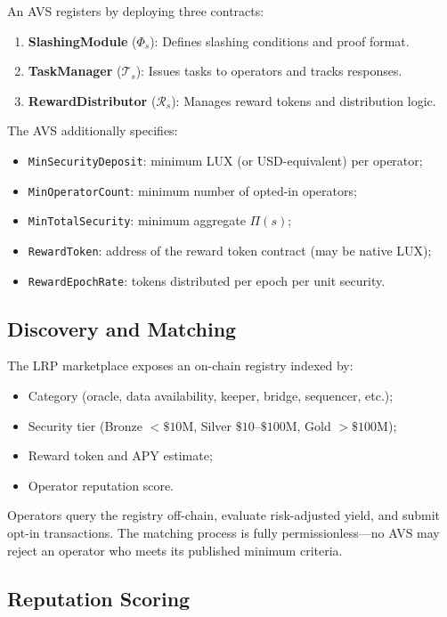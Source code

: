 \documentclass[11pt]{article}
\begin{document}
An AVS registers by deploying three contracts:

\begin{enumerate}[leftmargin=1.5em]
  \item \textbf{SlashingModule} ($\Phi_s$): Defines slashing conditions and proof format.
  \item \textbf{TaskManager} ($\mathcal{T}_s$): Issues tasks to operators and tracks responses.
  \item \textbf{RewardDistributor} ($\mathcal{R}_s$): Manages reward tokens and distribution logic.
\end{enumerate}

The AVS additionally specifies:
\begin{itemize}[leftmargin=1.5em]
  \item \texttt{MinSecurityDeposit}: minimum LUX (or USD-equivalent) per operator;
  \item \texttt{MinOperatorCount}: minimum number of opted-in operators;
  \item \texttt{MinTotalSecurity}: minimum aggregate $\Pi(s)$;
  \item \texttt{RewardToken}: address of the reward token contract (may be native LUX);
  \item \texttt{RewardEpochRate}: tokens distributed per epoch per unit security.
\end{itemize}

\subsection{Discovery and Matching}

The LRP marketplace exposes an on-chain registry indexed by:
\begin{itemize}[leftmargin=1.5em]
  \item Category (oracle, data availability, keeper, bridge, sequencer, etc.);
  \item Security tier (Bronze $< \$10$M, Silver $\$10$--$\$100$M, Gold $> \$100$M);
  \item Reward token and APY estimate;
  \item Operator reputation score.
\end{itemize}

Operators query the registry off-chain, evaluate risk-adjusted yield, and submit opt-in
transactions. The matching process is fully permissionless---no AVS may reject an operator
who meets its published minimum criteria.

\subsection{Reputation Scoring}
\end{document}

